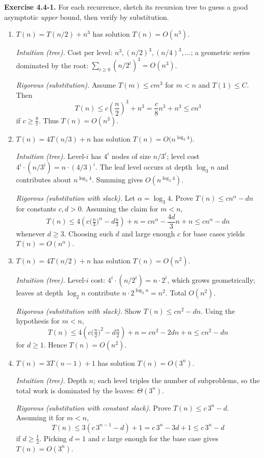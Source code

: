 \documentclass[12pt]{article}
\theoremstyle{definition}
\begin{document}
\noindent\textbf{Exercise 4.4-1.}
For each recurrence, sketch its recursion tree to guess a good asymptotic \emph{upper} bound,
then verify by substitution.

\begin{enumerate}
\item $T(n)=T(n/2)+n^{3}$ has solution $T(n)=O(n^{3})$.

\noindent\textit{Intuition (tree).} Cost per level: $n^{3},(n/2)^{3},(n/4)^{3},\ldots$;
a geometric series dominated by the root: $\sum_{i\ge0}(n/2^{i})^{3}=O(n^{3})$.

\noindent\textit{Rigorous (substitution).} Assume $T(m)\le c m^{3}$ for $m<n$ and $T(1)\le C$.
Then
\[
T(n)\le c\!\left(\frac{n}{2}\right)^{3}+n^{3}
=\frac{c}{8}n^{3}+n^{3}\le c n^{3}
\]
if $c\ge \tfrac{8}{7}$. Thus $T(n)=O(n^{3})$.
\medskip

\item $T(n)=4T(n/3)+n$ has solution $T(n)=O\!\big(n^{\log_{3}4}\big)$.

\noindent\textit{Intuition (tree).} Level-$i$ has $4^{i}$ nodes of size $n/3^{i}$; level cost
$\displaystyle 4^{i}\cdot (n/3^{i})=n\cdot (4/3)^{i}$. The leaf level occurs at depth
$\log_{3}n$ and contributes about $n^{\log_{3}4}$. Summing gives $O(n^{\log_{3}4})$.

\noindent\textit{Rigorous (substitution with slack).}
Let $\alpha=\log_{3}4$.
Prove $T(n)\le c n^{\alpha}-d n$ for constants $c,d>0$.
Assuming the claim for $m<n$,
\[
T(n)\le 4\!\left(c\Big(\tfrac{n}{3}\Big)^{\alpha}-d\tfrac{n}{3}\right)+n
= c n^{\alpha}-\frac{4d}{3}n+n
\le c n^{\alpha}-d n
\]
whenever $d\ge 3$. Choosing such $d$ and large enough $c$ for base cases yields $T(n)=O(n^{\alpha})$.

\medskip

\item $T(n)=4T(n/2)+n$ has solution $T(n)=O(n^{2})$.

\noindent\textit{Intuition (tree).} Level-$i$ cost: $4^{i}\cdot (n/2^{i})=n\cdot 2^{i}$,
which grows geometrically; leaves at depth $\log_{2}n$ contribute
$n\cdot 2^{\log_{2}n}=n^{2}$. Total $O(n^{2})$.

\noindent\textit{Rigorous (substitution with slack).}
Show $T(n)\le c n^{2}-d n$. Using the hypothesis for $m<n$,
\[
T(n)\le 4\!\left(c\Big(\tfrac{n}{2}\Big)^{2}-d\tfrac{n}{2}\right)+n
= c n^{2}-2dn+n\le c n^{2}-dn
\]
for $d\ge 1$. Hence $T(n)=O(n^{2})$.

\medskip

\item $T(n)=3T(n-1)+1$ has solution $T(n)=O(3^{n})$.

\noindent\textit{Intuition (tree).} Depth $n$; each level triples the number of subproblems,
so the total work is dominated by the leaves: $\Theta(3^{n})$.

\noindent\textit{Rigorous (substitution with constant slack).}
Prove $T(n)\le c\,3^{n}-d$.
Assuming it for $m<n$,
\[
T(n)\le 3(c\,3^{n-1}-d)+1=c\,3^{n}-3d+1\le c\,3^{n}-d
\]
if $d\ge \tfrac{1}{2}$. Picking $d=1$ and $c$ large enough for the base case gives $T(n)=O(3^{n})$.
\end{enumerate}
\end{document}
